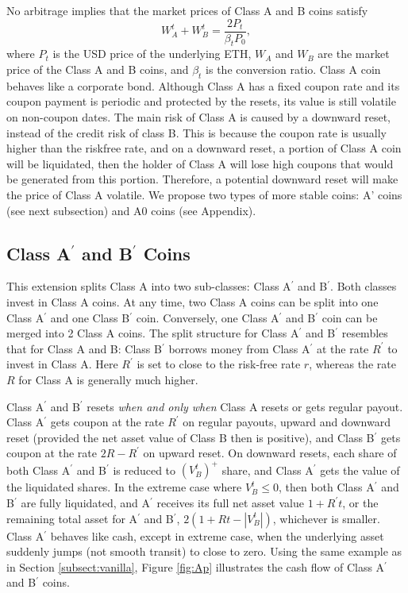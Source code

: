 \documentclass[final,pdftex]{ectaart}
\newcommand{\Ap}{A\ensuremath{^\prime}\xspace}
\newcommand{\Bp}{B\ensuremath{^\prime}\xspace}
\theoremstyle{plain}
\begin{document}
No arbitrage implies that the market prices of Class A and B coins satisfy
$$W_A^t +W_B^t=\frac{2 P_t}{\beta_t P_0},$$
where $P_t$ is the USD price of the underlying ETH, $W_A$ and $W_B$ are the market price of the Class A and B coins, and $\beta_t$ is the conversion ratio. Class A coin behaves like a corporate bond. Although Class A has a fixed coupon rate and its coupon payment is periodic and protected by the resets, its value is still volatile on non-coupon dates. The main risk of Class A is caused by a downward reset, instead of the credit risk of class B. This is because the coupon rate is usually higher than the riskfree rate, and on a downward reset, a portion of Class A coin will be liquidated, then the holder of Class A will lose high coupons that would be generated from this portion. Therefore, a potential downward reset will make the price of Class A volatile. We propose two types of more stable coins: A' coins (see next subsection) and A0 coins (see Appendix).


\subsection{\texorpdfstring{Class \Ap and \Bp Coins}{Lg}}
This extension splits Class A into two sub-classes: Class \Ap and \Bp. Both classes invest in Class A coins. At any time, two Class A coins can be split into one Class \Ap and one Class \Bp coin. Conversely, one Class \Ap and \Bp coin can be merged into 2 Class A coins. The split structure for Class \Ap and \Bp resembles that for Class A and B: Class \Bp borrows money from Class \Ap at the rate $R^\prime$ to invest in Class A. Here $R^\prime$ is set to close to the risk-free rate $r$, whereas the rate $R$ for Class A is generally much higher.

Class \Ap and \Bp resets {\it when and only when} Class A resets or gets regular payout. Class \Ap gets coupon at the rate $R^\prime$ on regular payouts, upward and downward reset (provided the net asset value of Class B then is positive), and Class \Bp gets coupon at the rate $2R-R^\prime$ on upward reset. On downward resets, each share of both Class \Ap and \Bp is reduced to $(V_B^t)^+$ share, and Class \Ap gets the value of the liquidated shares. In the extreme case where $V_B^t\le 0$, then both Class \Ap and \Bp are fully liquidated, and \Ap receives its full net asset value $1+R^\prime t$, or the remaining total asset for \Ap and \Bp, $2(1+Rt-|V_B^t|)$, whichever is smaller. Class \Ap behaves like cash, except in extreme case, when the underlying asset suddenly jumps (not smooth transit) to close to zero. Using the same example as in Section \ref{subsect:vanilla}, Figure \ref{fig:Ap} illustrates the cash flow of Class \Ap and \Bp coins.
\end{document}
